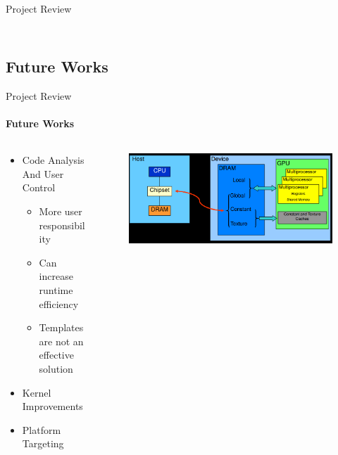 \begin{frame}[t]{Project Review}
\begin{columns}[T]
\begin{column}{.48\textwidth}
\begin{figure}
      \end{figure}
    \end{column}
    \end{columns}
	\end{frame}

	\subsection{Future Works}
	\begin{frame}[t]{Project Review}\framesubtitle{Future Works}
	\begin{columns}[T]
	\begin{column}{0.48\textwidth}
		\begin{itemize}
			\item Code Analysis And User Control
			\begin{itemize}
				\item More user responsibility
				\item Can increase runtime efficiency
				\item Templates are not an effective solution
			\end{itemize}
			\item Kernel Improvements
			\item Platform Targeting
		\end{itemize}
	\end{column}
	\begin{column}{.48\textwidth}
      \begin{figure}
         \includegraphics[width=1\textwidth]{images/GPUMemoryClear.png}

\end{figure}
\end{column}
\end{columns}
\end{frame}

